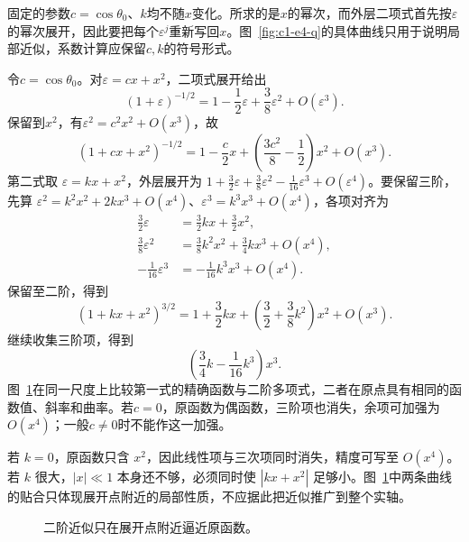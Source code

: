 \begin{solution}
固定的参数$c=\cos\theta_0$、$k$均不随$x$变化。所求的是$x$的幂次，而外层二项式首先按$\varepsilon$的幂次展开，因此要把每个$\varepsilon^j$重新写回$x$。图~\ref{fig:c1-e4-q}的具体曲线只用于说明局部近似，系数计算应保留$c,k$的符号形式。


令$c=\cos\theta_0$。对$\varepsilon=cx+x^2$，二项式展开给出
\[(1+\varepsilon)^{-1/2}=1-\frac12\varepsilon+\frac38\varepsilon^2+O(\varepsilon^3).
\]
保留到$x^2$，有$\varepsilon^2=c^2x^2+O(x^3)$，故
\[\boxed{(1+cx+x^2)^{-1/2}=1-\frac c2x+\left(\frac{3c^2}8-\frac12\right)x^2+O(x^3)}.\]
第二式取 $\varepsilon=kx+x^2$，外层展开为 $1+\tfrac32\varepsilon+\tfrac38\varepsilon^2-\tfrac1{16}\varepsilon^3+O(\varepsilon^4)$。要保留三阶，先算 $\varepsilon^2=k^2x^2+2kx^3+O(x^4)$、$\varepsilon^3=k^3x^3+O(x^4)$，各项对齐为
\[\begin{aligned}
\tfrac32\varepsilon&=\tfrac32kx+\tfrac32x^2,\\
\tfrac38\varepsilon^2&=\tfrac38k^2x^2+\tfrac34kx^3+O(x^4),\\
-\tfrac1{16}\varepsilon^3&=-\tfrac1{16}k^3x^3+O(x^4).
\end{aligned}\]
保留至二阶，得到
\[\boxed{(1+kx+x^2)^{3/2}=1+\frac32kx+\left(\frac32+\frac38k^2\right)x^2+O(x^3)}.\]
继续收集三阶项，得到
\[\left(\frac34k-\frac1{16}k^3\right)x^3.
\]
图~\ref{fig:c1-e4-s}在同一尺度上比较第一式的精确函数与二阶多项式，二者在原点具有相同的函数值、斜率和曲率。若$c=0$，原函数为偶函数，三阶项也消失，余项可加强为$O(x^4)$；一般$c\ne0$时不能作这一加强。


若 $k=0$，原函数只含 $x^2$，因此线性项与三次项同时消失，精度可写至 $O(x^4)$。若 $k$ 很大，$|x|\ll1$ 本身还不够，必须同时使 $|kx+x^2|$ 足够小。图~\ref{fig:c1-e4-s}中两条曲线的贴合只体现展开点附近的局部性质，不应据此把近似推广到整个实轴。

\begin{figure}[H]\centering
{}
\caption{二阶近似只在展开点附近逼近原函数。}\label{fig:c1-e4-s}
\end{figure}
\end{solution}

